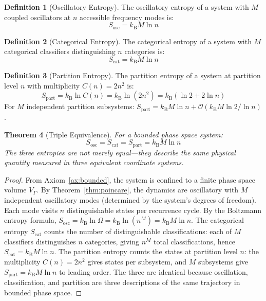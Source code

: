 \documentclass[twocolumn,10pt,a4paper]{article}
\newtheorem{theorem}{Theorem}[section]
\theoremstyle{definition}
\newtheorem{definition}[theorem]{Definition}
\theoremstyle{remark}
\newcommand{\Sosc}{S_{\mathrm{osc}}}
\newcommand{\Scat}{S_{\mathrm{cat}}}
\newcommand{\Spart}{S_{\mathrm{part}}}
\newcommand{\kB}{k_{\mathrm{B}}}
\newcommand{\Vgamma}{V_\Gamma}
\begin{document}
\begin{definition}[Oscillatory Entropy]
\label{def:sosc}
The oscillatory entropy of a system with $M$ coupled oscillators at $n$ accessible frequency modes is:
\begin{equation}
\label{eq:sosc}
\Sosc = \kB M \ln n
\end{equation}
\end{definition}

\begin{definition}[Categorical Entropy]
\label{def:scat}
The categorical entropy of a system with $M$ categorical classifiers distinguishing $n$ categories is:
\begin{equation}
\label{eq:scat}
\Scat = \kB M \ln n
\end{equation}
\end{definition}

\begin{definition}[Partition Entropy]
\label{def:spart}
The partition entropy of a system at partition level $n$ with multiplicity $C(n) = 2n^2$ is:
\begin{equation}
\label{eq:spart}
\Spart = \kB \ln C(n) = \kB \ln(2n^2) = \kB (\ln 2 + 2 \ln n)
\end{equation}
For $M$ independent partition subsystems: $\Spart = \kB M \ln n + \mathcal{O}(\kB M \ln 2/\ln n)$.
\end{definition}

\begin{theorem}[Triple Equivalence]
\label{thm:triple}
For a bounded phase space system:
\begin{equation}
\label{eq:triple}
\Sosc = \Scat = \Spart = \kB M \ln n
\end{equation}
The three entropies are not merely equal---they describe the same physical quantity measured in three equivalent coordinate systems.
\end{theorem}

\begin{proof}
From Axiom~\ref{ax:bounded}, the system is confined to a finite phase space volume $\Vgamma$. By Theorem~\ref{thm:poincare}, the dynamics are oscillatory with $M$ independent oscillatory modes (determined by the system's degrees of freedom). Each mode visits $n$ distinguishable states per recurrence cycle. By the Boltzmann entropy formula, $\Sosc = \kB \ln \Omega = \kB \ln(n^M) = \kB M \ln n$. The categorical entropy $\Scat$ counts the number of distinguishable classifications: each of $M$ classifiers distinguishes $n$ categories, giving $n^M$ total classifications, hence $\Scat = \kB M \ln n$. The partition entropy counts the states at partition level $n$: the multiplicity $C(n) = 2n^2$ gives states per subsystem, and $M$ subsystems give $\Spart = \kB M \ln n$ to leading order. The three are identical because oscillation, classification, and partition are three descriptions of the same trajectory in bounded phase space. \qedhere
\end{proof}
\end{document}
